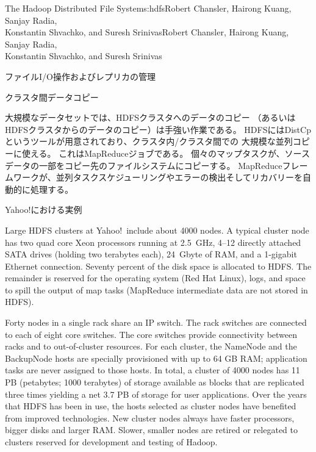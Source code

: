\begin{aosachaptertoc}{The Hadoop Distributed File System}{s:hdfs}{Robert Chansler, Hairong Kuang, Sanjay Radia, \\ Konstantin Shvachko, and Suresh Srinivas}{Robert Chansler, Hairong Kuang, Sanjay Radia, \\ \hspace*{0.9cm} Konstantin Shvachko, and Suresh Srinivas}
\begin{aosasect1}{ファイルI/O操作およびレプリカの管理}
\begin{aosasect2}{クラスタ間データコピー}

大規模なデータセットでは、HDFSクラスタへのデータのコピー
（あるいはHDFSクラスタからのデータのコピー）は手強い作業である。
HDFSにはDistCpというツールが用意されており、クラスタ内/クラスタ間での
大規模な並列コピーに使える。
これはMapReduceジョブである。
個々のマップタスクが、ソースデータの一部をコピー先のファイルシステムにコピーする。
MapReduceフレームワークが、並列タスクスケジューリングやエラーの検出そしてリカバリーを自動的に処理する。

\end{aosasect2}

\end{aosasect1}

\begin{aosasect1}{Yahoo!における実例}

Large HDFS clusters at Yahoo!\ include about 4000 nodes. A typical
cluster node has two quad core Xeon processors running at 2.5~GHz,
4--12 directly attached SATA drives (holding two terabytes each), 24~Gbyte of
RAM, and a 1-gigabit Ethernet connection.  Seventy percent of the disk
space is allocated to HDFS\@. The remainder is reserved for the
operating system (Red Hat Linux), logs, and space to spill the output
of map tasks (MapReduce intermediate data are not stored in HDFS).

Forty nodes in a single rack share an IP switch. The rack switches are
connected to each of eight core switches. The core switches provide
connectivity between racks and to out-of-cluster resources. For each
cluster, the NameNode and the BackupNode hosts are specially
provisioned with up to 64 GB RAM; application tasks are never assigned
to those hosts. In total, a cluster of 4000 nodes has 11 PB
(petabytes; 1000 terabytes) of storage available as blocks that are
replicated three times yielding a net 3.7 PB of storage for user
applications. Over the years that HDFS has been in use, the hosts
selected as cluster nodes have benefited from improved
technologies. New cluster nodes always have faster processors, bigger
disks and larger RAM\@. Slower, smaller nodes are retired or relegated
to clusters reserved for development and testing of Hadoop.


\end{aosasect1}
\end{aosachaptertoc}
